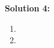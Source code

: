 \documentclass[]{article}
\begin{document}
\textbf{Solution 4:}
\begin{enumerate}[label=(\alph*)]
    \item %
    \item %
\end{enumerate}
\end{document}
